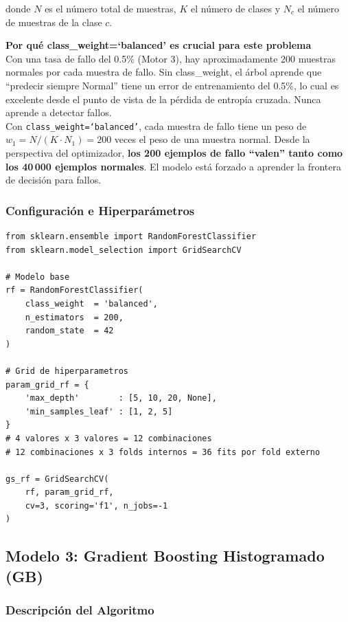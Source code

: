 \documentclass[12pt,a4paper]{article}
\begin{document}
donde $N$ es el n\'{u}mero total de muestras, $K$ el n\'{u}mero de clases y $N_c$ el
n\'{u}mero de muestras de la clase $c$.

\begin{porquebox}
\textbf{Por qu\'{e} class\_weight=`balanced' es crucial para este problema}\\[4pt]
Con una tasa de fallo del 0.5\% (Motor 3), hay aproximadamente 200 muestras normales
por cada muestra de fallo. Sin class\_weight, el \'{a}rbol aprende que ``predecir siempre
Normal'' tiene un error de entrenamiento del 0.5\%, lo cual es excelente desde el
punto de vista de la p\'{e}rdida de entropía cruzada. Nunca aprende a detectar fallos.\\[4pt]
Con \texttt{class\_weight=`balanced'}, cada muestra de fallo tiene un peso de
$w_1 = N/(K \cdot N_1) = 200$ veces el peso de una muestra normal.
Desde la perspectiva del optimizador, \textbf{los 200 ejemplos de fallo ``valen''
tanto como los 40\,000 ejemplos normales}. El modelo est\'{a} forzado a aprender
la frontera de decisi\'{o}n para fallos.
\end{porquebox}

\subsubsection{Configuraci\'{o}n e Hiperpar\'{a}metros}

\begin{lstlisting}[caption={Configuraci\'{o}n de Random Forest con GridSearchCV}]
from sklearn.ensemble import RandomForestClassifier
from sklearn.model_selection import GridSearchCV

# Modelo base
rf = RandomForestClassifier(
    class_weight  = 'balanced',
    n_estimators  = 200,
    random_state  = 42
)

# Grid de hiperparametros
param_grid_rf = {
    'max_depth'        : [5, 10, 20, None],
    'min_samples_leaf' : [1, 2, 5]
}
# 4 valores x 3 valores = 12 combinaciones
# 12 combinaciones x 3 folds internos = 36 fits por fold externo

gs_rf = GridSearchCV(
    rf, param_grid_rf,
    cv=3, scoring='f1', n_jobs=-1
)
\end{lstlisting}

\subsection{Modelo 3: Gradient Boosting Histogramado (GB)}

\subsubsection{Descripci\'{o}n del Algoritmo}
\end{document}
